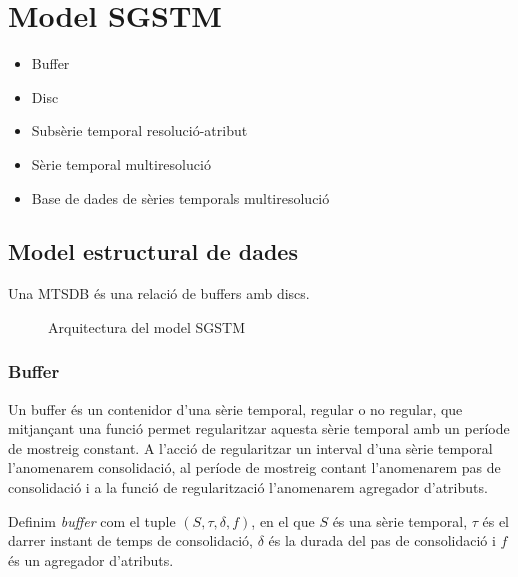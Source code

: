 \chapter{Model SGSTM}




\begin{itemize}
\item Buffer
\item Disc
\item Subsèrie temporal resolució-atribut
\item Sèrie temporal multiresolució
\item Base de dades de sèries temporals multiresolució
\end{itemize}







\section{Model estructural de dades}

Una MTSDB és una relació de buffers amb discs. 


\begin{figure}[tp]
\centering

\caption{Arquitectura del model SGSTM}
\label{fig:model:bdstm}
\end{figure}


\subsection{Buffer}\label{sec:model:buffer}

Un buffer és un contenidor d'una sèrie temporal, regular o no regular, que mitjançant una funció permet regularitzar aquesta sèrie temporal amb un període de mostreig constant. A l'acció de regularitzar un interval d'una sèrie temporal l'anomenarem consolidació, al període de mostreig contant l'anomenarem pas de consolidació i a la funció de regularització l'anomenarem agregador d'atributs.

\begin{definition}[Buffer]
  Definim \emph{buffer} com el tuple $(S,\tau,\delta,f)$, en el que
  $S$ és una sèrie temporal, $\tau$ és el darrer instant de temps de
  consolidació, $\delta$ és la durada del pas de consolidació i $f$ és
  un agregador d'atributs.
\end{definition}

